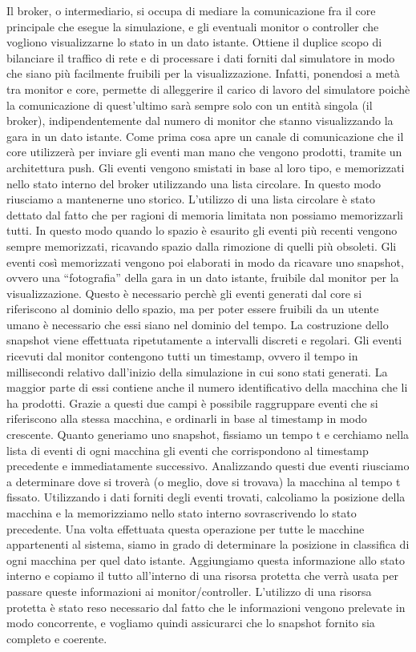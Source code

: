 Il broker, o intermediario, si occupa di mediare la comunicazione fra il core principale che esegue la simulazione, e gli eventuali monitor o controller che vogliono visualizzarne lo stato in un dato istante. Ottiene il duplice scopo di bilanciare il traffico di rete e di processare i dati forniti dal simulatore in modo che siano più facilmente fruibili per la visualizzazione. Infatti, ponendosi a metà tra monitor e core, permette di alleggerire il carico di lavoro del simulatore poichè la comunicazione di quest’ultimo sarà sempre solo con un entità singola (il broker), indipendentemente dal numero di monitor che stanno visualizzando la gara in un dato istante.
Come prima cosa apre un canale di comunicazione che il core utilizzerà per inviare gli eventi man mano che vengono prodotti, tramite un architettura push. Gli eventi vengono smistati in base al loro tipo, e memorizzati nello stato interno del broker utilizzando una lista circolare. In questo modo riusciamo a mantenerne uno storico. L’utilizzo di una lista circolare è stato dettato dal fatto che per ragioni di memoria limitata non possiamo memorizzarli tutti. In questo modo quando lo spazio è esaurito gli eventi più recenti vengono sempre memorizzati, ricavando spazio dalla rimozione di quelli più obsoleti.
Gli eventi così memorizzati vengono poi elaborati in modo da ricavare uno snapshot, ovvero una “fotografia” della gara in un dato istante, fruibile dal monitor per la visualizzazione. Questo è necessario perchè gli eventi generati dal core si riferiscono al dominio dello spazio, ma per poter essere fruibili da un utente umano è necessario che essi siano nel dominio del tempo.
La costruzione dello snapshot viene effettuata ripetutamente a intervalli discreti e regolari.
Gli eventi ricevuti dal monitor contengono tutti un timestamp, ovvero il tempo in millisecondi relativo dall’inizio della simulazione in cui sono stati generati. La maggior parte di essi contiene anche il numero identificativo della macchina che li ha prodotti. Grazie a questi due campi è possibile raggruppare eventi che si riferiscono alla stessa macchina, e ordinarli in base al timestamp in modo crescente.
Quanto generiamo uno snapshot, fissiamo un tempo t e cerchiamo nella lista di eventi di ogni macchina gli eventi che corrispondono al timestamp precedente e immediatamente successivo.
Analizzando questi due eventi riusciamo a determinare dove si troverà (o meglio, dove si trovava) la macchina al tempo t fissato. Utilizzando i dati forniti degli eventi trovati, calcoliamo la posizione della macchina e la memorizziamo nello stato interno sovrascrivendo lo stato precedente. Una volta effettuata questa operazione per tutte le macchine appartenenti al sistema, siamo in grado di determinare la posizione in classifica di ogni macchina per quel dato istante. Aggiungiamo questa informazione allo stato interno e copiamo il tutto all’interno di una risorsa protetta che verrà usata per passare queste informazioni ai monitor/controller. L’utilizzo di una risorsa protetta è stato reso necessario dal fatto che le informazioni vengono prelevate in modo concorrente, e vogliamo quindi assicurarci che lo snapshot fornito sia completo e coerente.
